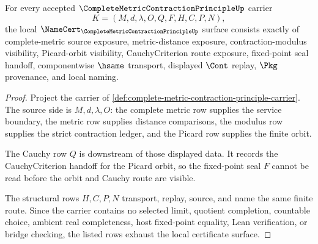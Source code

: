 \begin{theorem}
\label{thm:complete-metric-contraction-principle-namecert-obligations}
For every accepted $\CompleteMetricContractionPrincipleUp$ carrier
$$
K=(M,d,\lambda,O,Q,F,H,C,P,N),
$$
the local $\NameCert_{\CompleteMetricContractionPrincipleUp}$ surface consists exactly of complete-metric source exposure, metric-distance exposure, contraction-modulus visibility, Picard-orbit visibility, CauchyCriterion route exposure, fixed-point seal handoff, componentwise $\hsame$ transport, displayed $\Cont$ replay, $\Pkg$ provenance, and local naming.
\end{theorem}
\begin{proof}
Project the carrier of \autoref{def:complete-metric-contraction-principle-carrier}. The source side is $M,d,\lambda,O$: the complete metric row supplies the service boundary, the metric row supplies distance comparisons, the modulus row supplies the strict contraction ledger, and the Picard row supplies the finite orbit.

The Cauchy row $Q$ is downstream of those displayed data. It records the CauchyCriterion handoff for the Picard orbit, so the fixed-point seal $F$ cannot be read before the orbit and Cauchy route are visible.

The structural rows $H,C,P,N$ transport, replay, source, and name the same finite route. Since the carrier contains no selected limit, quotient completion, countable choice, ambient real completeness, host fixed-point equality, Lean verification, or bridge checking, the listed rows exhaust the local certificate surface.
\end{proof}

